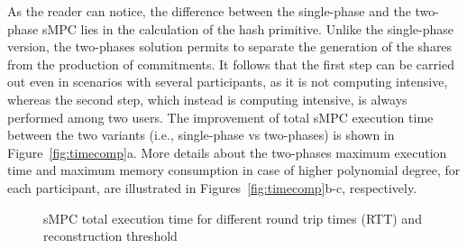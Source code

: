 As the reader can notice, the difference between the single-phase and the two-phase sMPC lies in the calculation of the hash primitive. 
Unlike the single-phase version, the two-phases solution permits to separate the generation of the shares from the production of commitments.
It follows that the first step can be carried out even in scenarios with several participants, as it is not computing intensive, whereas the second step, which instead is computing intensive, is always performed among two users.
The improvement of total sMPC execution time between the two variants (i.e., single-phase vs two-phases) is shown in Figure~\ref{fig:timecomp}a.
More details about the two-phases maximum execution time and maximum memory consumption in case of higher polynomial degree, for each participant, are illustrated in Figures~\ref{fig:timecomp}b-c, respectively.



\begin{figure}[t]
	\centering
	\hfill
	\hfill
	\caption{sMPC total execution time for different round trip times (RTT) and reconstruction threshold \K}
	\label{fig:timertt}
\end{figure}


